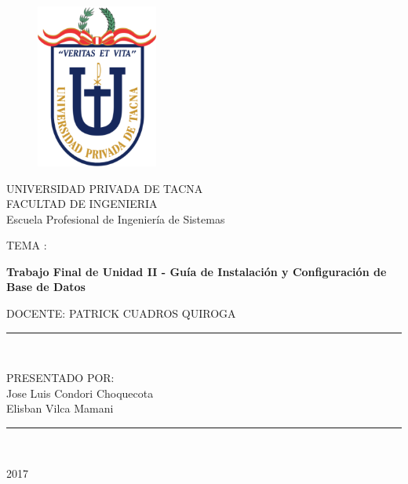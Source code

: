 \documentclass[a4paper,openright,12pt]{book}
\begin{document}
\begin{titlepage}
\begin{center}
\begin{figure}[htb]
\begin{center}
\includegraphics[width=4cm]{./images/upt}
\end{center}
\end{figure}

UNIVERSIDAD PRIVADA DE TACNA\\
\vspace*{0.10in}
FACULTAD DE INGENIERIA\\
Escuela Profesional de Ingeniería de Sistemas\\
\vspace*{0.2in}
\begin{large}
TEMA : \\
\end{large}
\vspace*{0.2in}
\begin{Large}
\textbf{Trabajo Final de Unidad II - Guía de Instalación y Configuración de Base de Datos} \\
\end{Large}
\vspace*{0.3in}
\begin{large}
DOCENTE: PATRICK CUADROS QUIROGA\\
\end{large}
\vspace*{0.3in}
\rule{80mm}{0.1mm}\\
\vspace*{0.1in}
\begin{large}
PRESENTADO POR: \\
Jose Luis Condori Choquecota \\
Elisban Vilca Mamani\\


\end{large}
\rule{80mm}{0.1mm}\\
\begin{large}
2017\\
\end{large}
\end{center}
\end{titlepage}
\end{document}
